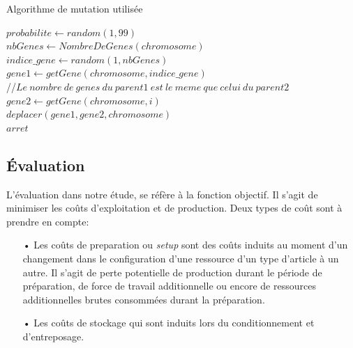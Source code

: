 \documentclass[12pt,a4paper]{article}
\begin{document}
	\begin{algorithm}[H]
 		\caption{Algorithme de mutation utilisée}
 		\label{alg:mutation}
 		\BlankLine
 		$probabilite \gets random(1,99)$ \\
 		\BlankLine
 		{
 			\BlankLine
 			$nbGenes \gets NombreDeGenes(chromosome)$\\
 			\BlankLine
 			$indice\_gene \gets random(1, nbGenes)$\\
 			\BlankLine
 			$gene1 \gets getGene(chromosome, indice\_gene)$ \\
 			\BlankLine
 			//$ Le \ nombre \ de \ genes \ du \ parent1 \ est \ le \ meme \ que \ celui \ du \ parent2 $\\
 			\BlankLine
 			{
 				\BlankLine
 				$gene2 \gets getGene(chromosome, i)$\\
 				\BlankLine
 				{
 					\BlankLine
 					$deplacer(gene1, gene2, chromosome)$ \\
 					\BlankLine
 					$arret$
 					\BlankLine
 				}
 			}
 		}
		\end{algorithm}
	
	\subsection{Évaluation}
	L'évaluation dans notre étude, se réfère à la fonction objectif. Il s'agit de minimiser les coûts d'exploitation et de production. Deux types de coût sont à prendre en compte:
	\begin{itemize}
		\item[•] Les coûts de preparation ou \emph{setup} sont des coûts induits au moment d'un changement dans le configuration d'une ressource d'un type d'article à un autre. Il s'agit de perte potentielle de production durant le période de préparation, de force de travail additionnelle ou encore de ressources additionnelles brutes consommées durant la préparation.
		\item[•] Les coûts de stockage qui sont induits lors du conditionnement et d’entreposage.
	\end{itemize}
	
\end{document}
